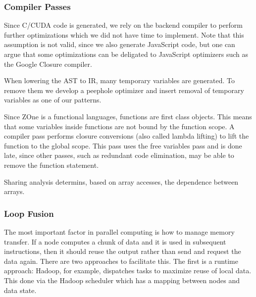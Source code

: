 \subsubsection{Compiler Passes}

Since C/CUDA code is generated, we rely on the backend compiler
	to perform further optimizations which we did not have time
	to implement.
Note that this assumption is not valid, since we also generate
	JavaScript code, but one can argue that some optimizations
	can be deligated to JavaScript optimizers such as the 
	Google Closure compiler. 


When lowering the AST to IR, many temporary variables are generated.
To remove them we develop a peephole optimizer and insert removal of
	temporary variables as one of our patterns.






Since ZOne is a functional languages, functions are 
	first class objects.
This means that some variables inside functions are not
	bound by the function scope.
A compiler pass performs closure conversions (also called
	lambda lifting) to lift the function to the global scope.
This pass uses the free variables pass and is done late,
	since other passes, such as 
	redundant code elimination, may be able to remove the
	function statement.


Sharing analysis determins, based on array accesses, the 
	dependence between arrays.


\subsubsection{Loop Fusion}\label{loop-fusion}

The most important factor in parallel computing is how to manage memory
transfer. If a node computes a chunk of data and it is used in
subsequent instructions, then it should reuse the output rather than
send and request the data again. There are two approaches to facilitate
this. The first is a runtime approach: Hadoop, for example, dispatches
tasks to maximize reuse of local data. This done via the Hadoop
scheduler which has a mapping between nodes and data state.

